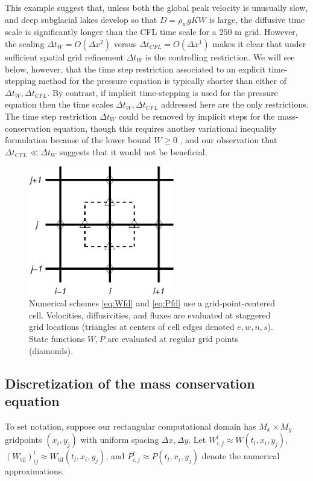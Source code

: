 \documentclass[11pt,final]{amsart}
\newcommand{\Wtil}{W_{\text{til}}}
\newcommand{\Wlij}{W^l_{i,j}}
\newcommand{\Plij}{P^l_{i,j}}
\begin{document}
This example suggest that, unless both the global peak velocity is unusually slow, and deep subglacial lakes develop so that $D = \rho_w g K W$ is large, the diffusive time scale is significantly longer than the CFL time scale for a $250$ m grid.  However, the scaling $\Delta t_W = O(\Delta x^2)$ versus $\Delta t_{CFL} = O(\Delta x^1)$ makes it clear that under sufficient spatial grid refinement $\Delta t_W$ is the controlling restriction.  We will see below, however, that the time step restriction associated to an explicit time-stepping method for the pressure equation is typically shorter than either of $\Delta t_W,\Delta t_{CFL}$.  By contrast, if implicit time-stepping is used for the pressure equation \citep{Hewittetal2012,Schoofetal2012} then the time scales $\Delta t_W, \Delta t_{CFL}$ addressed here are the only restrictions.  The time step restriction $\Delta t_W$ could be removed by implicit steps for the mass-conservation equation, though this requires another variational inequality formulation because of the lower bound $W\ge 0$ \citep[compare][]{JouvetBueler2012}, and our observation that $\Delta t_{CFL} \ll \Delta t_W$ suggests that it would not be beneficial.

\begin{figure}[ht]
\centering
\includegraphics[width=2.5in,keepaspectratio=true]{diffstencil}
\bigskip
\caption{Numerical schemes \eqref{eq:Wfd} and \eqref{eq:Pfd} use a grid-point-centered cell.  Velocities, diffusivities, and fluxes are evaluated at staggered grid locations (triangles at centers of cell edges denoted $e,w,n,s$).  State functions $W,P$ are evaluated at regular grid points (diamonds).}
\label{fig:stencil}
\end{figure}

\subsection*{Discretization of the mass conservation equation}  To set notation, suppose our rectangular computational domain has $M_x \times M_y$ gridpoints $(x_i,y_j)$ with uniform spacing $\Delta x,\Delta y$.  Let $\Wlij \approx W(t_l,x_i,y_j)$, $(\Wtil)_{ij}^l \approx \Wtil(t_l,x_i,y_j)$, and $\Plij \approx P(t_l,x_i,y_j)$ denote the numerical approximations.
\end{document}
